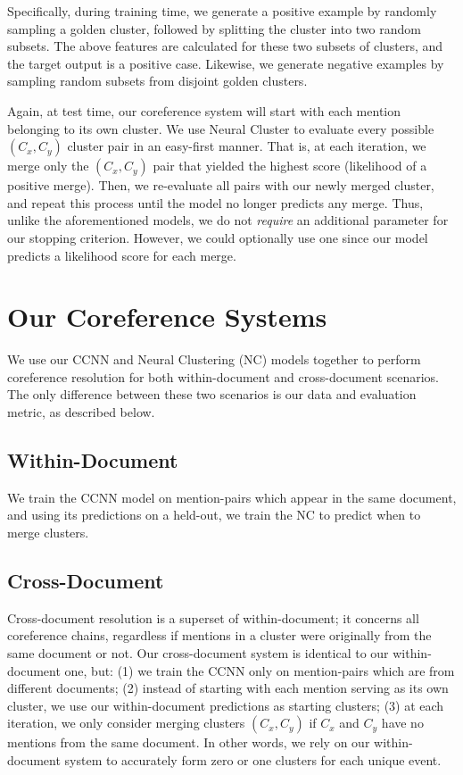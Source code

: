 \documentclass[11pt,a4paper]{article}
\begin{document}
Specifically, during training time, we generate a positive example by randomly sampling a golden cluster, followed by splitting the cluster into two random subsets.  The above features are calculated for these two subsets of clusters, and the target output is a positive case.  Likewise, we generate negative examples by sampling random subsets from disjoint golden clusters.

Again, at test time, our coreference system will start with each mention belonging to its own cluster.  We use Neural Cluster to evaluate every possible $(C_x, C_y)$ cluster pair in an easy-first manner.  That is, at each iteration, we merge only the $(C_x,C_y)$ pair that yielded the highest score (likelihood of a positive merge).  Then, we re-evaluate all pairs with our newly merged cluster, and repeat this process until the model no longer predicts any merge.  Thus, unlike the aforementioned models, we do not \textit{require} an additional parameter for our stopping criterion.  However, we could optionally use one since our model predicts a likelihood score for each merge.

\section{Our Coreference Systems}
\label{sec:coreference}

We use our CCNN and Neural Clustering (NC) models together to perform coreference resolution for both within-document and cross-document scenarios.  The only difference between these two scenarios is our data and evaluation metric, as described below.

\subsection{Within-Document}
We train the CCNN model on mention-pairs which appear in the same document, and using its predictions on a held-out, we train the NC to predict when to merge clusters.

\subsection{Cross-Document}
Cross-document resolution is a superset of within-document; it concerns all coreference chains, regardless if mentions in a cluster were originally from the same document or not.  Our cross-document system is identical to our within-document one, but: (1) we train the CCNN only on mention-pairs which are from different documents; (2) instead of starting with each mention serving as its own cluster, we use our within-document predictions as starting clusters; (3) at each iteration, we only consider merging clusters $(C_x,C_y)$ if $C_x$ and $C_y$ have no mentions from the same document.  In other words, we rely on our within-document system to accurately form zero or one clusters for each unique event.
\end{document}

